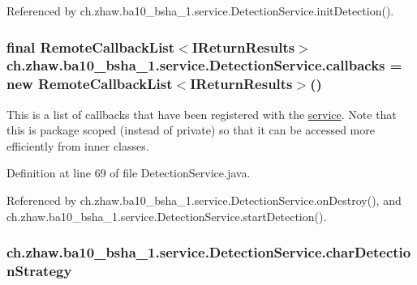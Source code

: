 Referenced by ch.zhaw.ba10\_\-bsha\_\-1.service.DetectionService.initDetection().\hypertarget{classch_1_1zhaw_1_1ba10__bsha__1_1_1service_1_1DetectionService_af1cfbca8177ea5c9c92d30b4f0f3052c}{
\subsubsection[{callbacks}]{\setlength{\rightskip}{0pt plus 5cm}final RemoteCallbackList$<$IReturnResults$>$ {\bf ch.zhaw.ba10\_\-bsha\_\-1.service.DetectionService.callbacks} = new RemoteCallbackList$<$IReturnResults$>$()}}
\label{classch_1_1zhaw_1_1ba10__bsha__1_1_1service_1_1DetectionService_af1cfbca8177ea5c9c92d30b4f0f3052c}
This is a list of callbacks that have been registered with the \hyperlink{namespacech_1_1zhaw_1_1ba10__bsha__1_1_1service}{service}. Note that this is package scoped (instead of private) so that it can be accessed more efficiently from inner classes. 

Definition at line 69 of file DetectionService.java.

Referenced by ch.zhaw.ba10\_\-bsha\_\-1.service.DetectionService.onDestroy(), and ch.zhaw.ba10\_\-bsha\_\-1.service.DetectionService.startDetection().\hypertarget{classch_1_1zhaw_1_1ba10__bsha__1_1_1service_1_1DetectionService_a27bece13d8cc4a8d488f104d078acfeb}{
\subsubsection[{charDetectionStrategy}]{ {\bf ch.zhaw.ba10\_\-bsha\_\-1.service.DetectionService.charDetectionStrategy}}}
\label{classch_1_1zhaw_1_1ba10__bsha__1_1_1service_1_1DetectionService_a27bece13d8cc4a8d488f104d078acfeb}


